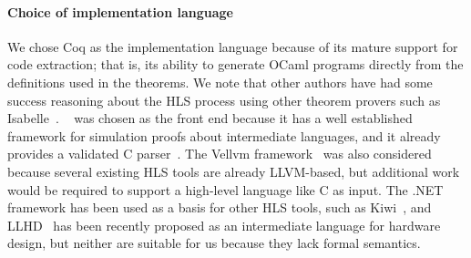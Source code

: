 
\paragraph{Choice of implementation language}
We chose Coq as the implementation language because of its mature support for
code extraction; that is, its ability to generate OCaml programs directly from
the definitions used in the theorems.  We note that other authors have had some
success reasoning about the HLS process using other theorem provers such as
Isabelle~\cite{ellis08_csicgfu}.
\compcert{}~\cite{leroy09_formal_verif_realis_compil} was chosen as the front
end because it has a well established framework for simulation proofs about
intermediate languages, and it already provides a validated C
parser~\cite{jourdan12_valid_lr_parser}.  The Vellvm
framework~\cite{zhao12_formal_llvm_inter_repres_verif_progr_trans} was also
considered because several existing HLS tools are already LLVM-based, but
additional work would be required to support a high-level language like C as
input.  The .NET framework has been used as a basis for other HLS tools, such as
Kiwi~\cite{greaves08_kiwi}, and LLHD~\cite{schuiki20_llhd} has been recently
proposed as an intermediate language for hardware design, but neither are
suitable for us because they lack formal semantics.


